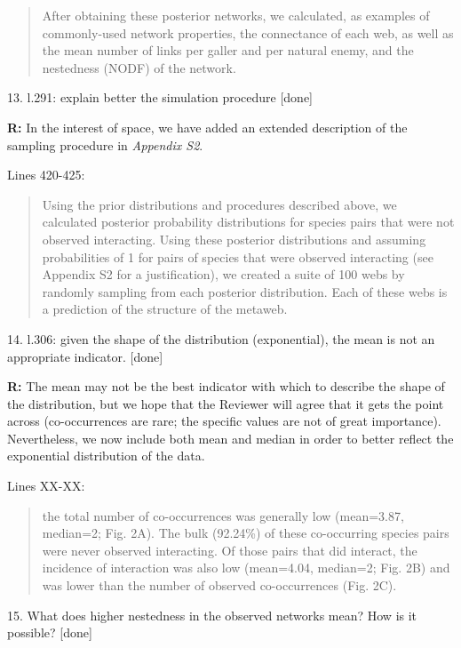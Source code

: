 \documentclass[12pt]{letter}
\begin{document}
		\begin{quotation}
			After obtaining these posterior networks, we calculated, as examples of commonly-used network properties, the connectance of each web, as well as the mean number of links per galler and per natural enemy, and the nestedness (NODF) of the network.
		\end{quotation}


	13. l.291: explain better the simulation procedure [done]
	

		\textbf{R:} In the interest of space, we have added an extended description of the sampling procedure in \emph{Appendix S2}. 


		Lines 420-425:


		\begin{quotation}
			Using the prior distributions and procedures described above, we calculated posterior probability distributions for species pairs that were not observed interacting. Using these posterior distributions and assuming probabilities of 1 for pairs of species that were observed interacting (see Appendix S2 for a justification), we created a suite of 100 webs by randomly sampling from each posterior distribution. Each of these webs is a prediction of the structure of the metaweb.
		\end{quotation}


	14. l.306: given the shape of the distribution (exponential), the mean is not an appropriate indicator. [done]


		\textbf{R:} The mean may not be the best indicator with which to describe the shape of the distribution, but we hope that the Reviewer will agree that it gets the point across (co-occurrences are rare; the specific values are not of great importance). Nevertheless, we now include both mean and median in order to better reflect the exponential distribution of the data.


		Lines XX-XX:


		\begin{quotation}
			the total number of co-occurrences was generally low (mean=3.87, median=2; Fig. 2A). The bulk (92.24\%) of these co-occurring species pairs were never observed interacting. Of those pairs that did interact, the incidence of interaction was also low (mean=4.04, median=2; Fig. 2B) and was lower than the number of observed co-occurrences (Fig. 2C).
		\end{quotation}


	15. What does higher nestedness in the observed networks mean? How is it possible? [done]
\end{document}
